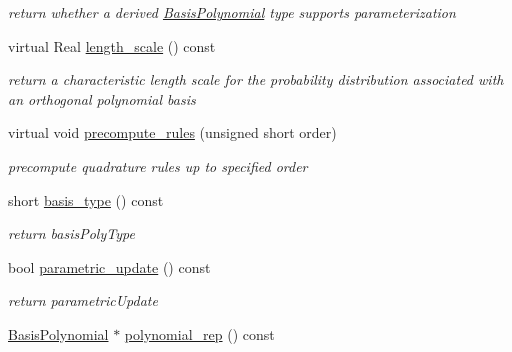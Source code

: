 \begin{DoxyCompactItemize}
\begin{DoxyCompactList}\small\item\em return whether a derived \hyperlink{classPecos_1_1BasisPolynomial}{Basis\+Polynomial} type supports parameterization \end{DoxyCompactList}\item 
virtual Real \hyperlink{classPecos_1_1BasisPolynomial_a8c1e8d014e82efc5a1c20f973b5bc715}{length\+\_\+scale} () const \label{classPecos_1_1BasisPolynomial_a8c1e8d014e82efc5a1c20f973b5bc715}

\begin{DoxyCompactList}\small\item\em return a characteristic length scale for the probability distribution associated with an orthogonal polynomial basis \end{DoxyCompactList}\item 
virtual void \hyperlink{classPecos_1_1BasisPolynomial_ad1f50a6d03d3b48687bf9c4ca889b389}{precompute\+\_\+rules} (unsigned short order)\label{classPecos_1_1BasisPolynomial_ad1f50a6d03d3b48687bf9c4ca889b389}

\begin{DoxyCompactList}\small\item\em precompute quadrature rules up to specified order \end{DoxyCompactList}\item 
short \hyperlink{classPecos_1_1BasisPolynomial_a5f8d739fc54e733bc9bfb7017234c82c}{basis\+\_\+type} () const \label{classPecos_1_1BasisPolynomial_a5f8d739fc54e733bc9bfb7017234c82c}

\begin{DoxyCompactList}\small\item\em return basis\+Poly\+Type \end{DoxyCompactList}\item 
bool \hyperlink{classPecos_1_1BasisPolynomial_a6e1b9ff4ca6f1269bb739b0de9e14dab}{parametric\+\_\+update} () const \label{classPecos_1_1BasisPolynomial_a6e1b9ff4ca6f1269bb739b0de9e14dab}

\begin{DoxyCompactList}\small\item\em return parametric\+Update \end{DoxyCompactList}\item 
\hyperlink{classPecos_1_1BasisPolynomial}{Basis\+Polynomial} $\ast$ \hyperlink{classPecos_1_1BasisPolynomial_ae1736d9eb56f44e3b85cc7c17a086de2}{polynomial\+\_\+rep} () const \label{classPecos_1_1BasisPolynomial_ae1736d9eb56f44e3b85cc7c17a086de2}


\end{DoxyCompactItemize}
